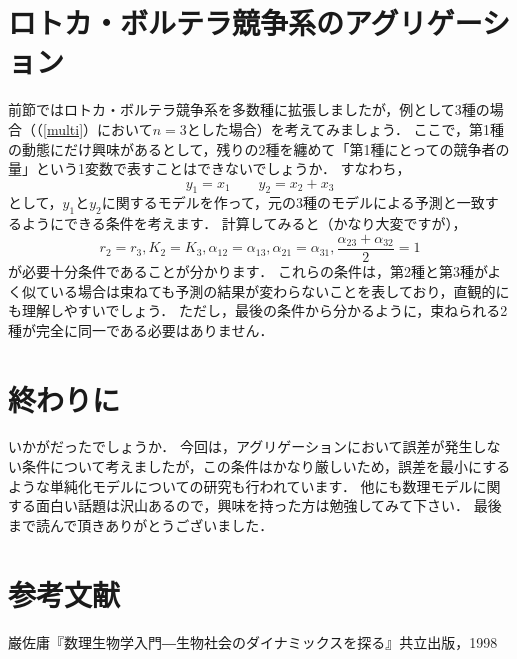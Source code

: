 \documentclass[a5paper]{jsarticle}
\begin{document}
\section{ロトカ・ボルテラ競争系のアグリゲーション}
前節ではロトカ・ボルテラ競争系を多数種に拡張しましたが，例として3種の場合（（\ref{multi}）において$n = 3$とした場合）を考えてみましょう．
ここで，第1種の動態にだけ興味があるとして，残りの2種を纏めて「第1種にとっての競争者の量」という1変数で表すことはできないでしょうか．
すなわち，
\[
  y_1 = x_1 \qquad y_2 = x_2 + x_3
\]
として，$y_1$と$y_2$に関するモデルを作って，元の3種のモデルによる予測と一致するようにできる条件を考えます．
計算してみると（かなり大変ですが），
\[
  r_2 = r_3, K_2 = K_3, \alpha_{12} = \alpha_{13}, \alpha_{21} = \alpha_{31}, \frac{\alpha_{23} + \alpha_{32}}{2} = 1
\]
が必要十分条件であることが分かります．
これらの条件は，第2種と第3種がよく似ている場合は束ねても予測の結果が変わらないことを表しており，直観的にも理解しやすいでしょう．
ただし，最後の条件から分かるように，束ねられる2種が完全に同一である必要はありません．
\section{終わりに}
いかがだったでしょうか．
今回は，アグリゲーションにおいて誤差が発生しない条件について考えましたが，この条件はかなり厳しいため，誤差を最小にするような単純化モデルについての研究も行われています．
他にも数理モデルに関する面白い話題は沢山あるので，興味を持った方は勉強してみて下さい．
最後まで読んで頂きありがとうございました．
\section{参考文献}
巌佐庸『数理生物学入門―生物社会のダイナミックスを探る』共立出版，1998
\end{document}
